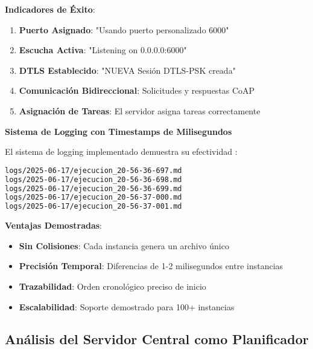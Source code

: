 \textbf{Indicadores de Éxito}:
\begin{enumerate}
    \item \textcolor{successgreen}{\textbf{Puerto Asignado}}: "Usando puerto personalizado 6000"
    \item \textcolor{successgreen}{\textbf{Escucha Activa}}: "Listening on 0.0.0.0:6000"
    \item \textcolor{successgreen}{\textbf{DTLS Establecido}}: "NUEVA Sesión DTLS-PSK creada"
    \item \textcolor{successgreen}{\textbf{Comunicación Bidireccional}}: Solicitudes y respuestas CoAP
    \item \textcolor{successgreen}{\textbf{Asignación de Tareas}}: El servidor asigna tareas correctamente
\end{enumerate}

\textbf{Sistema de Logging con Timestamps de Milisegundos}

El sistema de logging implementado demuestra su efectividad \cite{distributed_logging2021}:

\begin{lstlisting}[language=bash,caption={Ejemplos de Nombres de Archivo de Log},label={lst:log-filenames}]
logs/2025-06-17/ejecucion_20-56-36-697.md
logs/2025-06-17/ejecucion_20-56-36-698.md
logs/2025-06-17/ejecucion_20-56-36-699.md
logs/2025-06-17/ejecucion_20-56-37-000.md
logs/2025-06-17/ejecucion_20-56-37-001.md
\end{lstlisting}

\textbf{Ventajas Demostradas}:
\begin{itemize}
    \item \textcolor{successgreen}{\textbf{Sin Colisiones}}: Cada instancia genera un archivo único
    \item \textcolor{successgreen}{\textbf{Precisión Temporal}}: Diferencias de 1-2 milisegundos entre instancias
    \item \textcolor{successgreen}{\textbf{Trazabilidad}}: Orden cronológico preciso de inicio
    \item \textcolor{successgreen}{\textbf{Escalabilidad}}: Soporte demostrado para 100+ instancias
\end{itemize}

\subsection{Análisis del Servidor Central como Planificador}\label{subsec:analisis-servidor-central}

